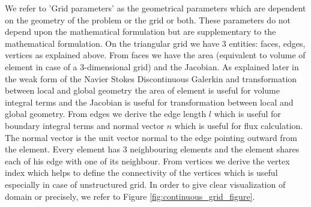 \documentclass[a4paper]{book}
\begin{document}
We refer to 'Grid parameters' as the geometrical parameters which are dependent on the geometry of the problem or the grid or both. These parameters do not depend upon the mathematical formulation but are supplementary to the mathematical formulation. On the triangular grid we have 3 entities: faces, edges, vertices as explained above. From faces we have the area (equivalent to volume of element in case of a 3-dimensional grid) and the Jacobian. As explained later in the weak form of the Navier Stokes Discontinuous Galerkin and transformation between local and global geometry the area of element is useful for volume integral terms and the Jacobian is useful for transformation between local and global geometry. From edges we derive the edge length $l$ which is useful for boundary integral terms and normal vector $n$ which is useful for flux calculation. The normal vector is the unit vector normal to the edge pointing outward from the element. Every element has 3 neighbouring elements and the element shares each of his edge with one of its neighbour. From vertices we derive the vertex index which helps to define the connectivity of the vertices which is useful especially in case of unstructured grid. In order to give clear visualization of domain or precisely, we refer to Figure \ref{fig:continuous_grid_figure}.
\end{document}
